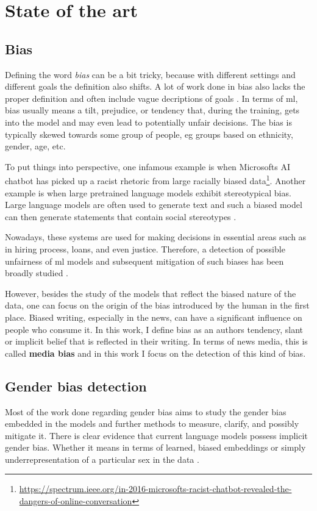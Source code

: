 \chapter{State of the art}

\section{Bias}
Defining the word \textit{bias} can be a bit tricky, because with different settings and different goals the definition also shifts. A lot of work done in bias also lacks the proper definition and often include vague decriptions of goals \cite{blodgett2020language}. In terms of \Gls{ml}, bias usually means a tilt, prejudice, or tendency that, during the training, gets into the model and may even lead to potentially unfair decisions. The bias is typically skewed towards some group of people, eg groups based on ethnicity, gender, age, etc. 

To put things into perspective, one infamous example is when Microsofts AI chatbot has picked up a racist rhetoric from large racially biased data\footnote{\url{https://spectrum.ieee.org/in-2016-microsofts-racist-chatbot-revealed-the-dangers-of-online-conversation}}. Another example is when large pretrained language models exhibit stereotypical bias. Large language models are often used to generate text and such a biased model can then generate statements that contain social stereotypes \cite{nadeem2021stereoset}.

Nowadays, these systems are used for making decisions in essential areas such as in hiring process, loans, and even justice. Therefore, a detection of possible unfairness of \Gls{ml} models and subsequent mitigation of such biases has been broadly studied \cite{blodgett2020language}.

However, besides the study of the models that reflect the biased nature of the data, one can focus on the origin of the bias introduced by the human in the first place. Biased writing, especially in the news, can have a significant influence on people who consume it. In this work, I define bias as an authors tendency, slant or implicit belief that is reflected in their writing. In terms of news media, this is called \textbf{media bias} and in this work I focus on the detection of this kind of bias.


\section{Gender bias detection}
Most of the work done regarding gender bias aims to study the gender bias embedded in the models and further methods to measure, clarify, and possibly mitigate it.
There is clear evidence that current language models possess implicit gender bias. Whether it means in terms of learned, biased embeddings \cite{bolukbasi2016man} or simply underrepresentation of a particular sex in the data \cite{sun-peng-2021-men}. 

